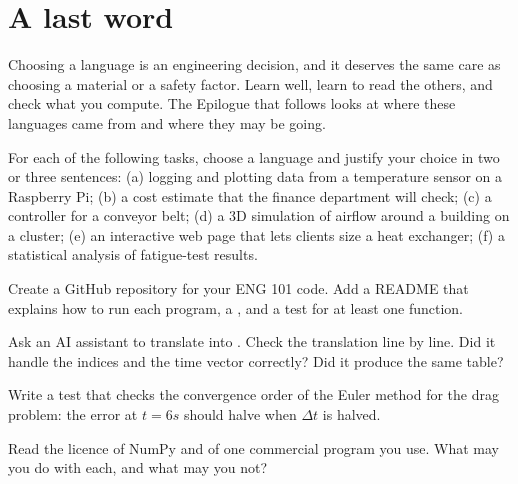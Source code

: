 \section{A last word}

Choosing a language is an engineering decision, and it deserves the same care as choosing
a material or a safety factor. Learn \py well, learn to read the others, and check what
you compute. The Epilogue that follows looks at where these languages came from and
where they may be going.

\begin{exercises}
\item For each of the following tasks, choose a language and justify your choice in two or
  three sentences: (a) logging and plotting data from a temperature sensor on a Raspberry
  Pi; (b) a cost estimate that the finance department will check; (c) a controller for a
  conveyor belt; (d) a 3D simulation of airflow around a building on a cluster; (e) an
  interactive web page that lets clients size a heat exchanger; (f) a statistical analysis
  of fatigue-test results.
\item Create a GitHub repository for your ENG 101 code. Add a README that explains how to
  run each program, a , and a test for at least one function.
\item Ask an AI assistant to translate  into \py. Check the translation line
  by line. Did it handle the indices and the time vector correctly? Did it produce the
  same table?
\item Write a test that checks the convergence order of the Euler method for the drag
  problem: the error at $t = 6\unit{s}$ should halve when $\Delta t$ is halved.
\item Read the licence of NumPy and of one commercial program you use. What may you do
  with each, and what may you not?
\end{exercises}
